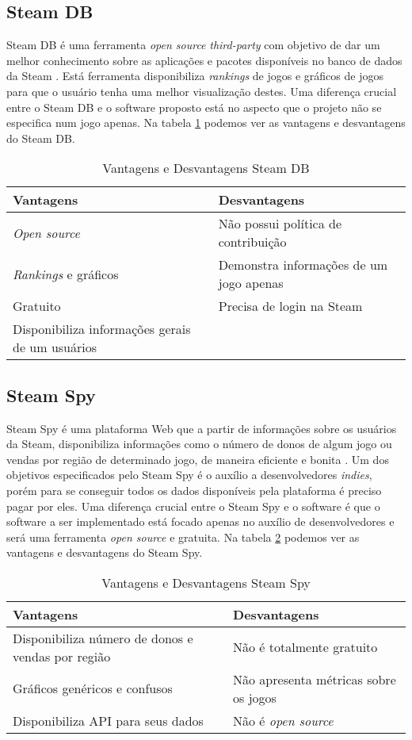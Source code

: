 \subsection{Steam DB}
Steam DB é uma ferramenta \textit{open source} \textit{third-party} com objetivo de dar um melhor conhecimento sobre as aplicações e pacotes disponíveis no banco de dados da Steam \cite{steam_db}. Está ferramenta disponibiliza \textit{rankings} de jogos e gráficos de jogos para que o usuário tenha uma melhor visualização destes. Uma diferença crucial entre o Steam DB e o software proposto está no aspecto que o projeto não se especifica num jogo apenas. Na tabela \ref{table:steam_db} podemos ver as vantagens e desvantagens do Steam DB.
\begin{table}
\centering
\begin{tabular}{|p{7cm}|p{7cm}|}
\hline \textbf{Vantagens} & \textbf{Desvantagens} \\
\hline \textit{Open source} & Não possui política de contribuição \\
\hline \textit{Rankings} e gráficos & Demonstra informações de um jogo apenas \\
\hline Gratuito & Precisa de login na Steam \\
\hline Disponibiliza informações gerais de um usuários & \\
\hline
\end{tabular}
\caption{Vantagens e Desvantagens Steam DB}
\label{table:steam_db}
\end{table}
\subsection{Steam Spy}
Steam Spy é uma plataforma Web que a partir de informações sobre os usuários da Steam, disponibiliza informações como o número de donos de algum jogo ou vendas por região de determinado jogo, de maneira eficiente e bonita \cite{steam_spy}. Um dos objetivos especificados pelo Steam Spy é o auxílio a desenvolvedores \textit{indies}, porém para se conseguir todos os dados disponíveis pela plataforma é preciso pagar por eles. Uma diferença crucial entre o Steam Spy e o software é que o software a ser implementado está focado apenas no auxílio de desenvolvedores e será uma ferramenta \textit{open source} e gratuita. Na tabela \ref{table:steam_spy} podemos ver as vantagens e desvantagens do Steam Spy.
\begin{table}
\centering
\begin{tabular}{|p{7cm}|p{7cm}|}
\hline \textbf{Vantagens} & \textbf{Desvantagens} \\
\hline Disponibiliza número de donos e vendas por região & Não é totalmente gratuito \\
\hline Gráficos genéricos e confusos & Não apresenta métricas sobre os jogos \\
\hline Disponibiliza API para seus dados & Não é \textit{open source} \\
\hline
\end{tabular}
\caption{Vantagens e Desvantagens Steam Spy}
\label{table:steam_spy}
\end{table}
